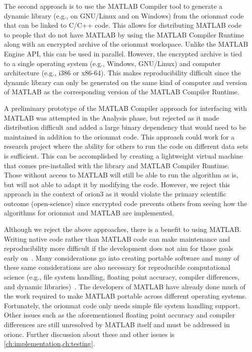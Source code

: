{
	The second approach is to use the MATLAB Compiler tool
	to generate a dynamic library (e.g.,  on GNU/Linux and
	 on Windows)
	from the \gls{orionmat} code that can be linked to C/C++ code.
	This allows for
	distributing MATLAB code to people that do not have
	MATLAB by using the MATLAB Compiler Runtime along with an
	encrypted archive of the \gls{orionmat} workspace. Unlike
	the MATLAB Engine API, this can be used in parallel.
	However, the encrypted archive is tied to a single
	operating system (e.g., Windows, GNU/Linux) and computer
	architecture (e.g., i386 or x86-64). This makes
	reproducibility difficult since the dynamic library can
	only be generated on the same kind of computer and version
	of MATLAB as the corresponding version of the MATLAB
	Compiler Runtime.

	A preliminary prototype of the MATLAB Compiler approach
	for interfacing with MATLAB was attempted in the Analysis
	phase, but rejected as it made distribution difficult and
	added a large binary dependency that would need to
	be maintained in addition to the \gls{orionmat} code. This
	approach could work for a research project where the
	ability for others to run the code on different data sets
	is sufficient. This can be accomplished by creating a
	lightweight virtual machine that comes pre-installed with
	the library and MATLAB Compiler Runtime. Those without
	access to MATLAB will still be able to run the algorithm
	as is, but will not able to adapt it by modifying the
	code. However, we reject this approach in the context of
	\gls{orion3} as it would violate the primary scientific
	outcome (open-science) since encrypted code prevents
	others from seeing how the algorithms for \gls{orionmat}
	and MATLAB are implemented.
}

Although we reject the above approaches, there is a benefit to
using MATLAB. Writing native code rather than MATLAB code can
make maintenance and reproducibility more difficult if the
development does not aim for those goals early on~\autocite{Donoho2009,Collberg2015}.
Many considerations go into creating portable software and many of
these same considerations are also necessary for reproducible
computational science (e.g., file system handling, floating point accuracy,
compiler differences, and dynamic libraries)~\autocite{PortableCode:Hook:2005}.
The developers of MATLAB have already done much of the work required
to make MATLAB portable across different operating systems.
Fortunately, the \gls{orionmat} code only needs simple file system
handling support. Other issues such as the aforementioned floating
point accuracy and compiler differences are still unresolved by
MATLAB itself and must be addressed in \gls{orionc}. Further
discussion about these and other issues is \cref{ch:implementation,ch:testing}.

